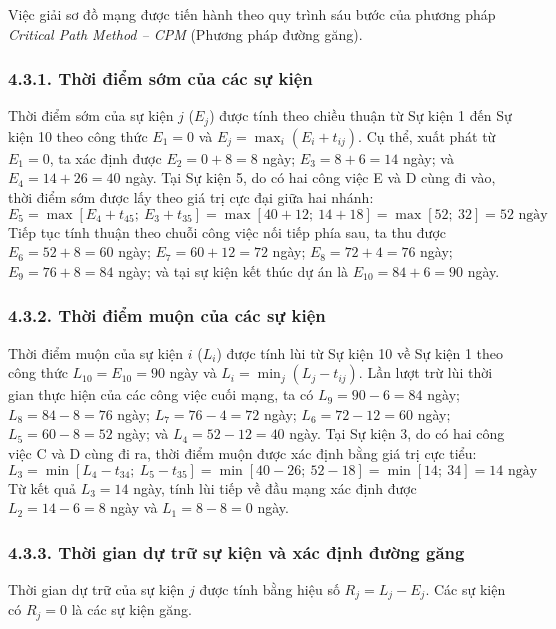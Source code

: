 Việc giải sơ đồ mạng được tiến hành theo quy trình sáu bước của phương pháp \textit{Critical Path Method -- CPM} (Phương pháp đường găng).

\subsubsection*{4.3.1. Thời điểm sớm của các sự kiện}

Thời điểm sớm của sự kiện $j$ ($E_j$) được tính theo chiều thuận từ Sự kiện 1 đến Sự kiện 10 theo công thức $E_1 = 0$ và $E_j = \max_{i} (E_i + t_{ij})$. Cụ thể, xuất phát từ $E_1 = 0$, ta xác định được $E_2 = 0 + 8 = 8$ ngày; $E_3 = 8 + 6 = 14$ ngày; và $E_4 = 14 + 26 = 40$ ngày. Tại Sự kiện 5, do có hai công việc E và D cùng đi vào, thời điểm sớm được lấy theo giá trị cực đại giữa hai nhánh:
\[
E_5 = \max\left[E_4 + t_{45};\ E_3 + t_{35}\right] = \max\left[40 + 12;\ 14 + 18\right] = \max[52;\ 32] = 52\text{ ngày}
\]
Tiếp tục tính thuận theo chuỗi công việc nối tiếp phía sau, ta thu được $E_6 = 52 + 8 = 60$ ngày; $E_7 = 60 + 12 = 72$ ngày; $E_8 = 72 + 4 = 76$ ngày; $E_9 = 76 + 8 = 84$ ngày; và tại sự kiện kết thúc dự án là $E_{10} = 84 + 6 = 90$ ngày.

\subsubsection*{4.3.2. Thời điểm muộn của các sự kiện}

Thời điểm muộn của sự kiện $i$ ($L_i$) được tính lùi từ Sự kiện 10 về Sự kiện 1 theo công thức $L_{10} = E_{10} = 90$ ngày và $L_i = \min_{j} (L_j - t_{ij})$. Lần lượt trừ lùi thời gian thực hiện của các công việc cuối mạng, ta có $L_9 = 90 - 6 = 84$ ngày; $L_8 = 84 - 8 = 76$ ngày; $L_7 = 76 - 4 = 72$ ngày; $L_6 = 72 - 12 = 60$ ngày; $L_5 = 60 - 8 = 52$ ngày; và $L_4 = 52 - 12 = 40$ ngày. Tại Sự kiện 3, do có hai công việc C và D cùng đi ra, thời điểm muộn được xác định bằng giá trị cực tiểu:
\[
L_3 = \min\left[L_4 - t_{34};\ L_5 - t_{35}\right] = \min\left[40 - 26;\ 52 - 18\right] = \min[14;\ 34] = 14\text{ ngày}
\]
Từ kết quả $L_3 = 14$ ngày, tính lùi tiếp về đầu mạng xác định được $L_2 = 14 - 6 = 8$ ngày và $L_1 = 8 - 8 = 0$ ngày.

\subsubsection*{4.3.3. Thời gian dự trữ sự kiện và xác định đường găng}

Thời gian dự trữ của sự kiện $j$ được tính bằng hiệu số $R_j = L_j - E_j$. Các sự kiện có $R_j = 0$ là các sự kiện găng.

